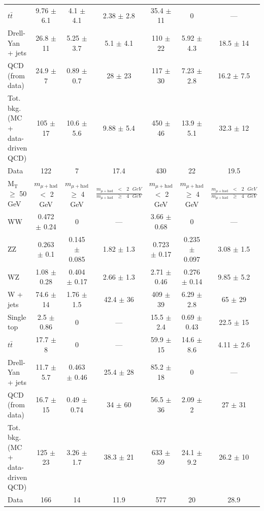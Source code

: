 \begin{table}
\begin{center}
{\begin{tabular}{|l|c|c|c|c|c|c|}
$t\bar{t}$ & 9.76 $\pm$ 6.1 & 4.1 $\pm$ 4.1 & 2.38 $\pm$ 2.8 & 35.4 $\pm$ 11 & 0 & --- \\
Drell-Yan + jets & 26.8 $\pm$ 11 & 5.25 $\pm$ 3.7 & 5.1 $\pm$ 4.1 & 110 $\pm$ 22 & 5.92 $\pm$ 4.3 & 18.5 $\pm$ 14 \\
QCD (from data) & 24.9 $\pm$ 7 & 0.89 $\pm$ 0.7 & 28 $\pm$ 23 & 117 $\pm$ 30 & 7.23 $\pm$ 2.8 & 16.2 $\pm$ 7.5 \\
Tot. bkg. (MC + data-driven QCD) & 105 $\pm$ 17 & 10.6 $\pm$ 5.6 & 9.88 $\pm$ 5.4 & 450 $\pm$ 46 & 13.9 $\pm$ 5.1 & 32.3 $\pm$ 12 \\
Data & 122 & 7 & 17.4 & 430 & 22 & 19.5 \\
\hline
$\text{M}_{\text{T}}$ $\geq$ 50 GeV & $m_{\mu+\text{had}}$ $<$ 2 GeV & $m_{\mu+\text{had}}$ $\ge$ 4 GeV & $\frac{m_{\mu+\text{had}}\text{ }<\text{ }2\text{ }GeV}{m_{\mu+\text{had}}\text{ }\ge\text{ }4\text{ }GeV}$ & $m_{\mu+\text{had}}$ $<$ 2 GeV & $m_{\mu+\text{had}}$ $\ge$ 4 GeV & $\frac{m_{\mu+\text{had}}\text{ }<\text{ }2\text{ }GeV}{m_{\mu+\text{had}}\text{ }\ge\text{ }4\text{ }GeV}$ \\
\hline
WW & 0.472 $\pm$ 0.24 & 0 & --- & 3.66 $\pm$ 0.68 & 0 & --- \\
ZZ & 0.263 $\pm$ 0.1 & 0.145 $\pm$ 0.085 & 1.82 $\pm$ 1.3 & 0.723 $\pm$ 0.17 & 0.235 $\pm$ 0.097 & 3.08 $\pm$ 1.5 \\
WZ & 1.08 $\pm$ 0.28 & 0.404 $\pm$ 0.17 & 2.66 $\pm$ 1.3 & 2.71 $\pm$ 0.46 & 0.276 $\pm$ 0.14 & 9.85 $\pm$ 5.2 \\
W + jets & 74.6 $\pm$ 14 & 1.76 $\pm$ 1.5 & 42.4 $\pm$ 36 & 409 $\pm$ 39 & 6.29 $\pm$ 2.8 & 65 $\pm$ 29 \\
Single top & 2.5 $\pm$ 0.86 & 0 & --- & 15.5 $\pm$ 2.4 & 0.69 $\pm$ 0.43 & 22.5 $\pm$ 15 \\
$t\bar{t}$ & 17.7 $\pm$ 8 & 0 & --- & 59.9 $\pm$ 15 & 14.6 $\pm$ 8.6 & 4.11 $\pm$ 2.6 \\
Drell-Yan + jets & 11.7 $\pm$ 5.7 & 0.463 $\pm$ 0.46 & 25.4 $\pm$ 28 & 85.2 $\pm$ 18 & 0 & --- \\
QCD (from data) & 16.7 $\pm$ 15 & 0.49 $\pm$ 0.74 & 34 $\pm$ 60 & 56.5 $\pm$ 36 & 2.09 $\pm$ 2 & 27 $\pm$ 31 \\
Tot. bkg. (MC + data-driven QCD) & 125 $\pm$ 23 & 3.26 $\pm$ 1.7 & 38.3 $\pm$ 21 & 633 $\pm$ 59 & 24.1 $\pm$ 9.2 & 26.2 $\pm$ 10 \\
Data & 166 & 14 & 11.9 & 577 & 20 & 28.9 \\
\hline
\end{tabular}}
\end{center}
\end{table}

